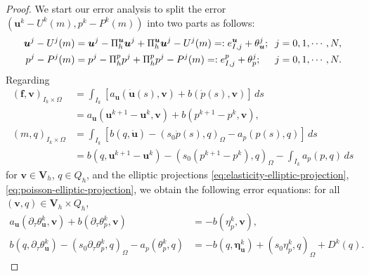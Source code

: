 \documentclass{amsart}
\newcommand{\LRp}[1]{\left( #1 \right)}
\newcommand{\LRs}[1]{\left[ #1 \right]}
\begin{document}
\begin{proof}
    We start our error analysis to split the error $({\boldsymbol{u}}^k-U^k({m}), {p}^k-P^k({m}))$ into two parts as follows: 
\begin{align*}
	{\boldsymbol{u}}^j-U^j({m})&={\boldsymbol{u}}^j-\Pi_h^{\boldsymbol{u}} {\boldsymbol{u}}^j+\Pi_h^{\boldsymbol{u}} {\boldsymbol{u}}^j-U^j({m}) =: e_{I,j}^{\boldsymbol{u}}+\theta^j_{\boldsymbol{u}}; &&\hspace{-1mm} j = 0,1,\cdots,N,
    \\
	{p}^j-P^j(m)&={p}^j-\Pi_h^p {p}^j+\Pi_h^p {p}^j-P^j({m}) =: e_{I,j}^p+\theta^j_p;&&\hspace{-1mm} j = 0,1,\cdots,N.
\end{align*}
%
Regarding
%
\begin{align*}
    (\boldsymbol{f}, \boldsymbol{v})_{I_k \times \Omega} &=\int_{I_k} \LRs{a_{\boldsymbol{u}}(\dot{{\boldsymbol{u}}}(s), \boldsymbol{v}) + b(\dot{{p}}(s), \boldsymbol{v})} \,ds 
    \\
    &= a_{\boldsymbol{u}}({\boldsymbol{u}}^{k+1} - {\boldsymbol{u}}^k, \boldsymbol{v}) + b({p}^{k+1} - {p}^k, \boldsymbol{v}),
    \\
    ({m}, q)_{I_k \times \Omega} &=\int_{I_k} \LRs{ b(q, \dot{{\boldsymbol{u}}}) - (s_0 \dot{{p}}(s), q)_{\Omega} - a_p( {p}(s), q) } \,ds 
    \\
    &= b(q, {\boldsymbol{u}}^{k+1} - {\boldsymbol{u}}^k) - (s_0 ({p}^{k+1} - {p}^k), q)_{\Omega} - \int_{I_k} a_p(p, q) \,ds 
\end{align*}
%
for $\boldsymbol{v} \in \boldsymbol{V}_h$, $q \in Q_h$, and the elliptic projections \eqref{eq:elasticity-elliptic-projection}, \eqref{eq:poisson-elliptic-projection}, we obtain the following error equations:
for all $(\boldsymbol v,q)\in \boldsymbol V_h\times Q_h$,
%
\begin{align}
\label{eq:theta-error-1}
a_{\boldsymbol u}(\partial_\tau\theta_{\boldsymbol u}^k,\boldsymbol v)
+
b(\partial_\tau\theta_p^k,\boldsymbol v)
&=
-b(\eta_p^k,\boldsymbol v),
\\
\label{eq:theta-error-2}
b(q,\partial_\tau\theta_{\boldsymbol u}^k)
-
(s_0\partial_\tau\theta_p^k,q)_\Omega
-
a_p(\theta_p^k,q)
&=
-b(q,\boldsymbol\eta_{\boldsymbol u}^k)
+
(s_0\eta_p^k,q)_\Omega
+
D^k(q).
\end{align}
%
%

\end{proof}
\end{document}
